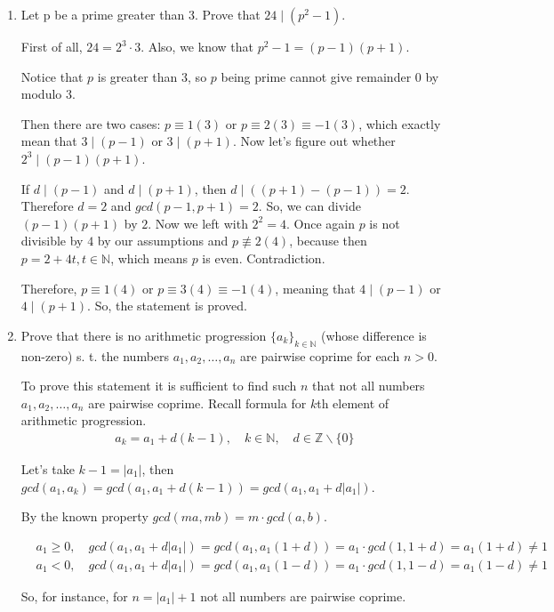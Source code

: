 \documentclass{article}
\begin{document}
\begin{enumerate}
\item Let p be a prime greater than 3. Prove that $24 \mid (p^2-1)$.
\newline
 
First of all, $24 = 2^3\cdot3$. Also, we know that $p^2-1=(p-1)(p+1)$. 

Notice that $p$ is greater than $3$, so $p$ being prime cannot give remainder $0$ by modulo $3$. 

Then there are two cases: $p \equiv 1(3)$ or $p \equiv 2(3) \equiv -1 (3)$, which exactly mean that $3 \mid (p-1)$ or $3 \mid (p+1)$. Now let's figure out whether $2^3 \mid (p-1)(p+1)$.

If $d \mid (p-1)$ and $d \mid (p+1)$, then $d \mid ((p+1) - (p-1)) = 2$. Therefore $d=2$ and $gcd(p-1,p+1)=2$. So, we can divide $(p-1)(p+1)$ by $2$. Now we left with $2^2=4$. Once again $p$ is not divisible by $4$ by our assumptions and $p \not\equiv 2 (4)$, because then $p=2+4t, t \in \mathbb{N}$, which means $p$ is even. Contradiction.

Therefore, $p \equiv 1(4)$ or $p \equiv 3(4) \equiv -1 (4)$, meaning that $4 \mid (p-1)$ or $4 \mid (p+1)$. So, the statement is proved.

\item Prove that there is no arithmetic progression $\{a_k\}_{k \in \mathbb{N}}$ (whose difference is non-zero) s. t. the numbers $a_1, a_2, \ldots{}, a_n$ are pairwise coprime for each $n > 0$. 
\newline

To prove this statement it is sufficient to find such $n$ that not all numbers $a_1, a_2, \ldots{}, a_n$ are pairwise coprime. Recall formula for $k$th element of arithmetic progression.
\begin{align*}
a_k=a_1+d(k-1), \quad k \in \mathbb{N}, \quad d \in \mathbb{Z}\backslash \{0\}
\end{align*}

Let's take $k-1=|a_1|$, then $gcd(a_1, a_k)=gcd(a_1, a_1 + d(k-1))=gcd(a_1, a_1+d|a_1|)$.

By the known property $gcd(ma,mb)=m \cdot gcd(a,b)$. 

\begin{align*}
&a_1 \geq 0, \quad gcd(a_1, a_1+d|a_1|)=gcd(a_1, a_1(1+d))=a_1 \cdot gcd(1, 1 + d) = a_1(1+d) \neq 1\\
&a_1 < 0, \quad gcd(a_1, a_1+d|a_1|)=gcd(a_1, a_1(1-d))=a_1 \cdot gcd(1, 1-d)=a_1(1-d) \neq 1
\end{align*}

So, for instance, for $n=|a_1|+1$ not all numbers are pairwise coprime.


\end{enumerate}
\end{document}
